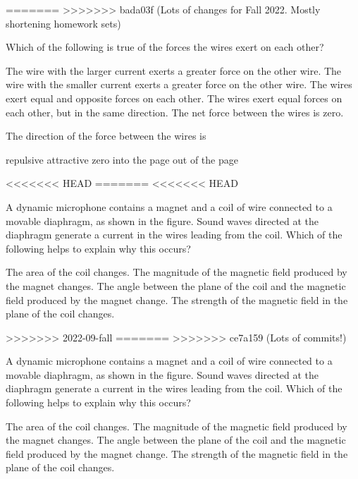 \documentclass{../../oss-apphys-exam}
\begin{document}
\begin{multicols*}{2}
\begin{questions}
=======
>>>>>>> bada03f (Lots of changes for Fall 2022. Mostly shortening homework sets)

    \question Which of the following is true of the forces the wires exert on
    each other?
    \begin{choices}
      \choice The wire with the larger current exerts a greater force on the
      other wire.
      \choice The wire with the smaller current exerts a greater force on the
      other wire.
      \choice The wires exert equal and opposite forces on each other.
      \choice The wires exert equal forces on each other, but in the same
      direction.
      \choice The net force between the wires is zero.
    \end{choices}
    \label{q:2curr1}
    
    \question The direction of the force between the wires is
    \begin{choices}
      \choice repulsive
      \choice attractive
      \choice zero
      \choice into the page
      \choice out of the page
    \end{choices}
    \label{q:2curr2}
<<<<<<< HEAD
=======
    \vspace{.7in}
<<<<<<< HEAD
    
    \question A dynamic microphone contains a magnet and a coil of wire
    connected to a movable diaphragm, as shown in the figure. Sound waves
    directed at the diaphragm generate a current in the wires leading from the
    coil. Which of the following helps to explain why this occurs?
    \begin{choices}
      \choice The area of the coil changes.
      \choice The magnitude of the magnetic field produced by the magnet
      changes.
      \choice The angle between the plane of the coil and the magnetic field
      produced by the magnet change.
      \choice The strength of the magnetic field in the plane of the coil
      changes.
    \end{choices}
>>>>>>> 2022-09-fall
    \columnbreak
=======
>>>>>>> ce7a159 (Lots of commits!)
    
    \question A dynamic microphone contains a magnet and a coil of wire
    connected to a movable diaphragm, as shown in the figure. Sound waves
    directed at the diaphragm generate a current in the wires leading from the
    coil. Which of the following helps to explain why this occurs?
    \begin{choices}
      \choice The area of the coil changes.
      \choice The magnitude of the magnetic field produced by the magnet
      changes.
      \choice The angle between the plane of the coil and the magnetic field
      produced by the magnet change.
      \choice The strength of the magnetic field in the plane of the coil
      changes.
    \end{choices}
    \columnbreak
    

\end{questions}
\end{multicols*}
\end{document}
